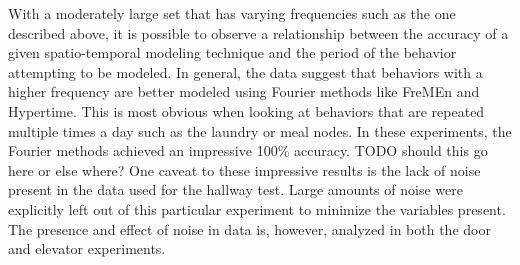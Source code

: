 With a moderately large set that has varying frequencies such as the one
described above, it is possible to observe a relationship between the accuracy
of a given spatio-temporal modeling technique and the period of the behavior
attempting to be modeled. In general, the data suggest that behaviors with
a higher frequency are better modeled using Fourier methods like FreMEn and
Hypertime. This is most obvious when looking at behaviors that are repeated multiple
times a day such as the laundry or meal nodes. In these experiments, the Fourier
methods achieved an impressive 100\% accuracy. TODO should this go here or
else where?  One caveat to these impressive results is the lack of noise
present in the data used for the hallway test. Large amounts of noise were
explicitly left out of this particular experiment to minimize the variables
present. The presence and effect of noise in data is, however, analyzed in
both the door and elevator experiments. \\

\begin{table}[h!]
  \centering
  \caption{Hallway Laundry Section}
\end{table}

\begin{table}[h!]
  \centering
  \caption{Hallway Meal Section 0}
\end{table}

